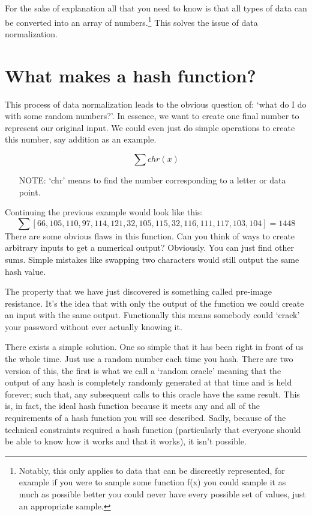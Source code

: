 \documentclass[11pt, oneside]{article}   	%
\begin{document}
For the sake of explanation all that you need to know is that all types of data can be converted into an array of numbers.\footnote{Notably, this only applies to data that can be discreetly represented, for example if you were to sample some function f(x) you could sample it as much as possible better you could never have every possible set of values, just an appropriate sample.} This solves the issue of data normalization.

\section{What makes a hash function?}
This process of data normalization leads to the obvious question of: ‘what do I do with some random numbers?’. In essence, we want to create one final number to represent our original input. We could even just do simple operations to create this number, say addition as an example.

\begin{equation}
    \sum chr(x)
\end{equation}
\begin{itemize}
    \item[NOTE:] ‘chr’ means to find the number corresponding to a letter or data point.
\end{itemize}
Continuing the previous example would look like this:
\begin{equation}
\sum [66, 105, 110, 97, 114, 121, 32, 105, 115, 32, 116, 111, 117, 103, 104] = 1448
\end{equation}
There are some obvious flaws in this function. Can you think of ways to create arbitrary inputs to get a numerical output? Obviously. You can just find other sums. Simple mistakes like swapping two characters would still output the same hash value.

The property that we have just discovered is something called pre-image resistance. It’s the idea that with only the output of the function we could create an input with the same output. Functionally this means somebody could ‘crack’ your password without ever actually knowing it.

There exists a simple solution. One so simple that it has been right in front of us the whole time. Just use a random number each time you hash. There are two version of this, the first is what we call a ‘random oracle’ meaning that the output of any hash is completely randomly generated at that time and is held forever; such that, any subsequent calls to this oracle have the same result. This is, in fact, the ideal hash function because it meets any and all of the requirements of a hash function you will see described. Sadly, because of the technical constraints required a hash function (particularly that everyone should be able to know how it works and that it works), it isn’t possible.
\end{document}
